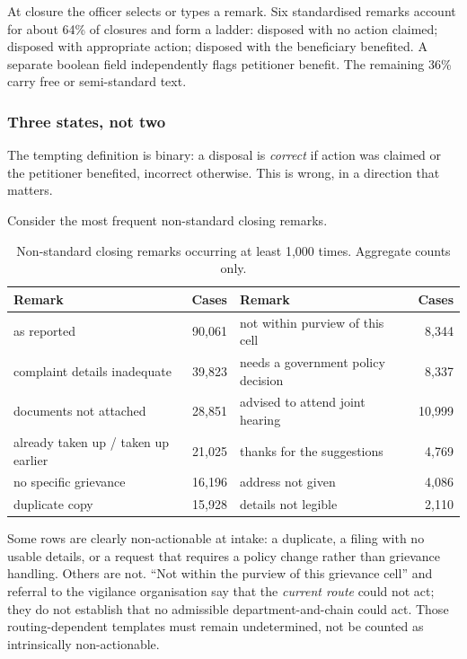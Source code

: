 \documentclass[11pt,a4paper]{article}
\theoremstyle{plain}
\theoremstyle{definition}
\theoremstyle{remark}
\begin{document}
At closure the officer selects or types a remark. Six standardised remarks account for about
64\% of closures and form a ladder: disposed with no action claimed; disposed with appropriate
action; disposed with the beneficiary benefited. A separate boolean field independently flags
petitioner benefit. The remaining 36\% carry free or semi-standard text.

\subsubsection{Three states, not two}\label{sec:threestate}

The tempting definition is binary: a disposal is \emph{correct} if action was claimed or the
petitioner benefited, incorrect otherwise. This is wrong, in a direction that matters.

Consider the most frequent non-standard closing remarks.

\begin{table}[h]
\centering
\caption{Non-standard closing remarks occurring at least 1,000 times. Aggregate counts only.}
\label{tab:offladder}
\begin{tabular}{p{5.0cm}r@{\qquad}p{5.0cm}r}
\toprule
Remark & Cases & Remark & Cases\\
\midrule
as reported & 90,061 & not within purview of this cell & 8,344\\
complaint details inadequate & 39,823 & needs a government policy decision & 8,337\\
documents not attached & 28,851 & advised to attend joint hearing & 10,999\\
already taken up / taken up earlier & 21,025 & thanks for the suggestions & 4,769\\
no specific grievance & 16,196 & address not given & 4,086\\
duplicate copy & 15,928 & details not legible & 2,110\\
\bottomrule
\end{tabular}
\end{table}

Some rows are clearly non-actionable at intake: a duplicate, a filing with no usable details,
or a request that requires a policy change rather than grievance handling. Others are not.
``Not within the purview of this grievance cell'' and referral to the vigilance organisation
say that the \emph{current route} could not act; they do not establish that no admissible
department-and-chain could act. Those routing-dependent templates must remain undetermined,
not be counted as intrinsically non-actionable.
\end{document}
